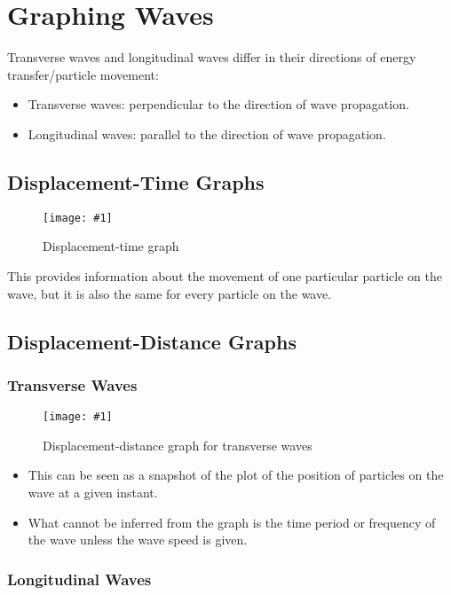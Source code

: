 \documentclass[a4paper,12pt]{article}
\let\oldsection\section
\renewcommand\section{\clearpage\oldsection}
\newcommand{\img}[4]{\begin{center}
  \begin{figure}[H]
    \centering
    \texttt{[image: \#1]}
    \caption{#3}
    \label{fig:#4}
  \end{figure}
\end{center}}
\begin{document}
\section{Graphing Waves}

Transverse waves and longitudinal waves differ in their directions of energy transfer/particle movement:
\begin{itemize}
  \item Transverse waves: perpendicular to the direction of wave propagation.
  \item Longitudinal waves: parallel to the direction of wave propagation.
\end{itemize}

\subsection{Displacement-Time Graphs}

\img{distancetime.png}{0.9}{Displacement-time graph}{distancetime}

This provides information about the movement of one particular particle on the wave, but it is also the same for every particle on the wave.


\subsection{Displacement-Distance Graphs}

\subsubsection{Transverse Waves}

\img{dd_transverse.png}{0.9}{Displacement-distance graph for transverse waves}{dd_transverse}

\begin{itemize}
  \item This can be seen as a snapshot of the plot of the position of particles on the wave at a given instant.
  \item What cannot be inferred from the graph is the time period or frequency of the wave unless the wave speed is given.
\end{itemize}

\pagebreak

\subsubsection{Longitudinal Waves}
\end{document}

